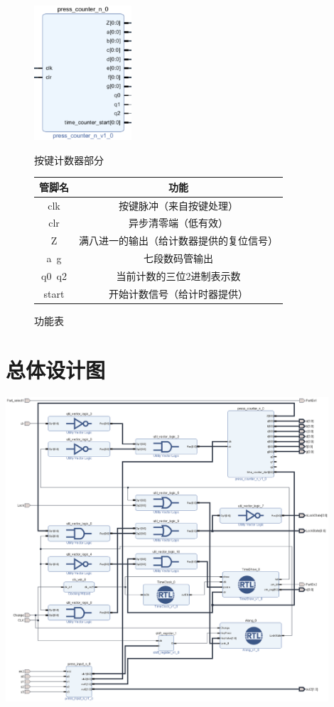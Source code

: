 \documentclass[a4paper,11pt]{ctexart}
\begin{document}
\begin{figure}[htb]
  \begin{minipage}[b]{0.5\textwidth}
    \centering
    \includegraphics[height= 5cm]{./images/p1.eps}
    \caption{按键计数器部分}
    \label{fig:by:table}
  \end{minipage}%
  \begin{minipage}[b]{0.5\textwidth}
    \centering
    \begin{tabular}{|c|c|} \hline
      管脚名 & 功能 \\ \hline\hline
      clk      &  按键脉冲（来自按键处理）\\
      clr      & 异步清零端（低有效） \\
      Z        & 满八进一的输出（给计数器提供的复位信号） \\
      a~g      & 七段数码管输出 \\
      q0~q2    & 当前计数的三位2进制表示数 \\
      start    & 开始计数信号（给计时器提供） \\ \hline
    \end{tabular}
    \caption{功能表}
    \label{table:by:fig}
  \end{minipage}
\end{figure}


\section{总体设计图}

\includegraphics[width=0.9\textwidth]{./images/electric_lock.eps}
\end{document}
